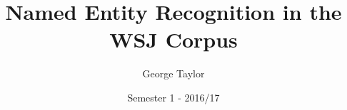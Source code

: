 \documentclass[12pt]{article}
\begin{document}
\nocite{*}

\title{Named Entity Recognition in the WSJ Corpus}
\author{George Taylor}
\date{Semester 1 - 2016/17}
\maketitle
\twocolumn
\end{document}

